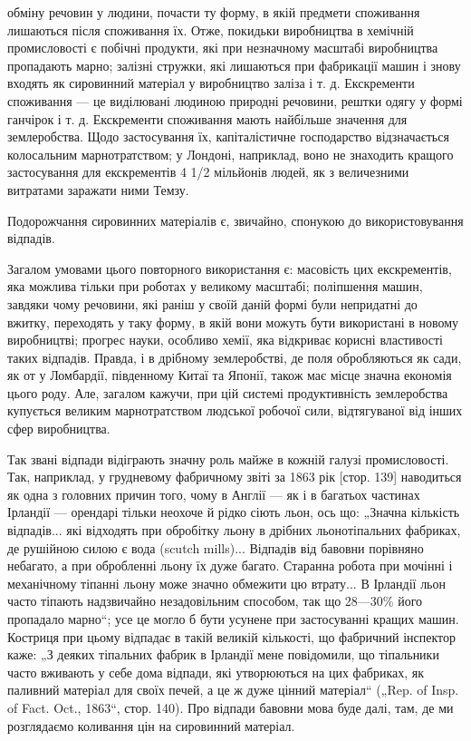 \parcont{}  %
обміну речовин у людини, почасти ту форму, в якій предмети
споживання лишаються після споживання їх. Отже, покидьки
виробництва в хемічній промисловості є побічні продукти, які
при незначному масштабі виробництва пропадають марно; залізні
стружки, які лишаються при фабрикації машин і знову входять
як сировинний матеріал у виробництво заліза і т. д. Екскременти споживання — це виділювані людиною
природні речовини,
рештки одягу у формі ганчірок і т. д. Екскременти споживання
мають найбільше значення для землеробства. Щодо застосування
їх, капіталістичне господарство відзначається колосальним марнотратством; у Лондоні, наприклад, воно
не знаходить кращого
застосування для екскрементів 4 1/2 мільйонів людей, як з величезними витратами заражати ними Темзу.

Подорожчання сировинних матеріалів є, звичайно, спонукою
до використовування відпадів.

Загалом умовами цього повторного використання є: масовість
цих екскрементів, яка можлива тільки при роботах у великому
масштабі; поліпшення машин, завдяки чому речовини, які раніш
у своїй даній формі були непридатні до вжитку, переходять
у таку форму, в якій вони можуть бути використані в новому
виробництві; прогрес науки, особливо хемії, яка відкриває корисні властивості таких відпадів.
Правда, і в дрібному землеробстві, де поля обробляються як сади, як от у Ломбардії, південному Китаї
та Японії, також має місце значна економія
цього роду. Але, загалом кажучи, при цій системі продуктивність землеробства купується великим
марнотратством людської робочої сили, відтягуваної від інших сфер виробництва.

Так звані відпади відіграють значну роль майже в кожній
галузі промисловості. Так, наприклад, у грудневому фабричному звіті за 1863 рік [стор. 139]
наводиться як одна з головних
причин того, чому в Англії — як і в багатьох частинах Ірландії —
орендарі тільки неохоче й рідко сіють льон, ось що: „Значна
кількість відпадів... які відходять при обробітку льону в дрібних льонотіпальних фабриках, де
рушійною силою є вода
(scutch mills)... Відпадів від бавовни порівняно небагато, а при
обробленні льону їх дуже багато. Старанна робота при мочінні і механічному тіпанні льону може значно
обмежити цю
втрату... В Ірландії льон часто тіпають надзвичайно незадовільним способом, так що 28—30\% його
пропадало марно“; усе це
могло б бути усунене при застосуванні кращих машин. Костриця при цьому відпадає в такій великій
кількості, що фабричний інспектор каже: „З деяких тіпальних фабрик в Ірландії
мене повідомили, що тіпальники часто вживають у себе дома
відпади, які утворюються на цих фабриках, як паливний матеріал для своїх печей, а це ж дуже цінний
матеріал“ („Rep. of
Insp. of Fact. Oct., 1863“, стор. 140). Про відпади бавовни мова
буде далі, там, де ми розглядаємо коливання цін на сировинний
матеріал.
